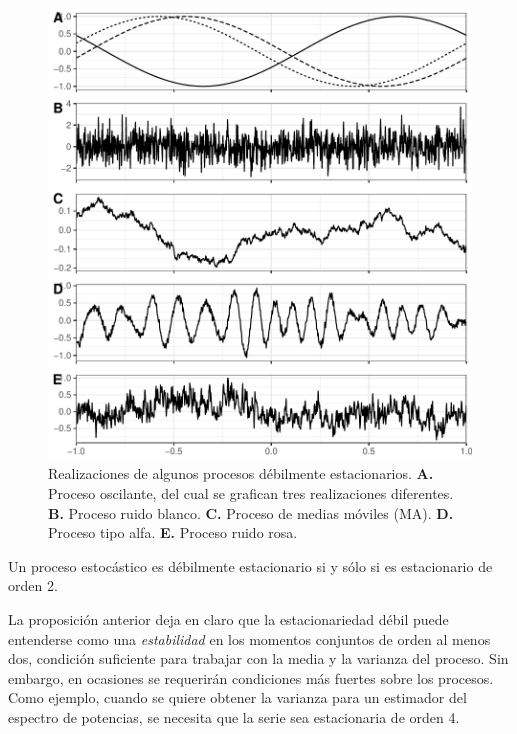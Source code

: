 \begin{figure}
\centering
\includegraphics[width=\linewidth]{./img_mas_ejemplos/ruidos_ejemplos.pdf}
\caption[Realizaciones de algunos proceso débilmente estacionarios]{Realizaciones de algunos procesos débilmente estacionarios. \textbf{A.} Proceso oscilante, del cual se grafican tres realizaciones diferentes. \textbf{B.} Proceso ruido blanco. \textbf{C.} Proceso de medias móviles (MA). \textbf{D.} Proceso tipo alfa. \textbf{E.} Proceso ruido rosa.}
\end{figure}

\begin{proposicion}
Un proceso estocástico es débilmente estacionario si y sólo si es estacionario de orden 2.
\end{proposicion}

La proposición anterior deja en claro que la estacionariedad débil puede entenderse como una \textit{estabilidad} en los momentos conjuntos de orden al menos dos, condición suficiente para trabajar con la media y la varianza del proceso.
%
Sin embargo, en ocasiones se requerirán condiciones más fuertes sobre los procesos. Como ejemplo, cuando se quiere obtener la varianza para un estimador del espectro de potencias, se necesita que la serie sea estacionaria de orden 4. 


